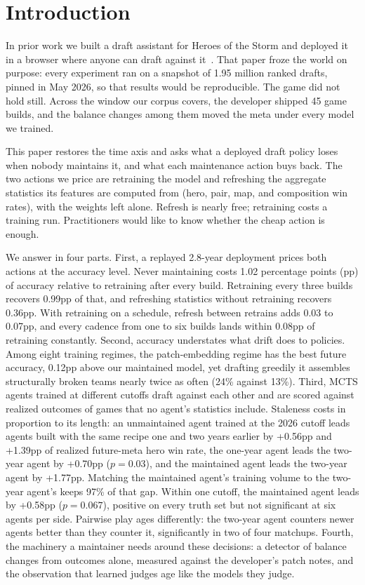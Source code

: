 \documentclass[journal]{IEEEtran}
\begin{document}
\section{Introduction}

In prior work we built a draft assistant for Heroes of the Storm and
deployed it in a browser where anyone can draft against
it~\cite{paper1}. That paper froze the world on purpose: every
experiment ran on a snapshot of 1.95 million ranked drafts, pinned in
May 2026, so that results would be reproducible. The game did not hold
still. Across the window our corpus covers, the developer shipped 45
game builds, and the balance changes among them moved the meta under
every model we trained.

This paper restores the time axis and asks what a deployed draft policy
loses when nobody maintains it, and what each maintenance action buys
back. The two actions we price are retraining the model and refreshing
the aggregate statistics its features are computed from (hero, pair,
map, and composition win rates), with the weights left alone. Refresh is
nearly free; retraining costs a training run. Practitioners would like
to know whether the cheap action is enough.

We answer in four parts. First, a replayed 2.8-year deployment prices
both actions at the accuracy level. Never maintaining costs 1.02
percentage points (pp) of accuracy relative to retraining after every
build. Retraining every three builds recovers 0.99pp of that, and
refreshing statistics without retraining recovers 0.36pp. With retraining
on a schedule, refresh between retrains adds 0.03 to 0.07pp, and every
cadence from one to six builds lands within 0.08pp of retraining
constantly. Second, accuracy understates what drift does to policies.
Among eight training regimes, the patch-embedding regime has the best
future accuracy, 0.12pp above our maintained model, yet drafting
greedily it assembles structurally broken teams nearly twice as often
(24\% against 13\%). Third, MCTS agents trained at different cutoffs draft against each other
and are scored against realized outcomes of games that no agent's
statistics include. Staleness costs in proportion to its length: an
unmaintained agent trained at the 2026 cutoff leads agents built with
the same recipe one and two years earlier by +0.56pp and +1.39pp of
realized future-meta hero win rate, the one-year agent leads the
two-year agent by +0.70pp ($p = 0.03$), and the maintained agent leads
the two-year agent by +1.77pp. Matching the maintained agent's training
volume to the two-year agent's keeps 97\% of that gap. Within one
cutoff, the maintained agent leads by +0.58pp ($p = 0.067$), positive on
every truth set but not significant at six agents per side. Pairwise
play ages differently: the two-year agent counters newer agents better
than they counter it, significantly in two of four matchups. Fourth, the machinery a maintainer needs around these
decisions: a detector of balance changes from outcomes alone, measured
against the developer's patch notes, and the observation that learned
judges age like the models they judge.
\end{document}
